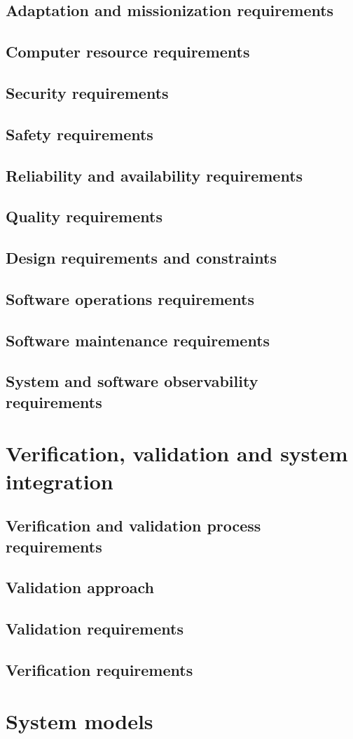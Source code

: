 \subsection{Adaptation and missionization requirements }
\subsection{Computer resource requirements}
\subsection{Security requirements }
\subsection{Safety requirements}
\subsection{Reliability and availability requirements}
\subsection{Quality requirements}
\subsection{Design requirements and constraints}
\subsection{Software operations requirements}
\subsection{Software maintenance requirements}
\subsection{System and software observability requirements}
\section{Verification, validation and system integration}
 \subsection{Verification and validation process requirements}
 \subsection{Validation approach}
 \subsection{Validation requirements}
 \subsection{Verification requirements}
 \section{System models}

